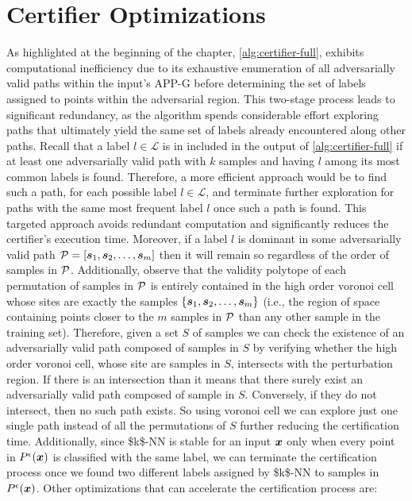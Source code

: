 \section{Certifier Optimizations}
\label{subsec:certifier-optimizations}
As highlighted at the beginning of the chapter, \autoref{alg:certifier-full}, exhibits computational inefficiency due to its exhaustive enumeration of all adversarially valid paths within the input's \acs{APP-G} before determining the set of labels assigned to points within the adversarial region. This two-stage process leads to significant redundancy, as the algorithm spends considerable effort exploring paths that ultimately yield the same set of labels already encountered along other paths. Recall that a label $l \in \mathcal{L}$ is in included in the output of \autoref{alg:certifier-full} if at least one adversarially valid path with $k$ samples and having $l$ among its most common labels is found. Therefore, a more efficient approach would be to find such a path, for each possible label $l \in \mathcal{L}$, and terminate further exploration for paths with the same most frequent label $l$ once such a path is found. This targeted approach avoids redundant computation and significantly reduces the certifier's execution time. Moreover, if a label $l$ is dominant in some adversarially valid path $\vpath = [\sample[1], \sample[2],\ldots,\sample[m]]$ then it will remain so regardless of the order of samples in $\vpath$. Additionally, observe that the validity polytope of each permutation of samples in $\vpath$ is entirely contained in the high order voronoi cell \cite{voronoi-tessellation, high-order-voronoi} whose sites are exactly the samples $\{\sample[1], \sample[2],\ldots,\sample[m]\}$ (i.e., the region of space containing points closer to the $m$ samples in $\vpath$ than any other sample in the training set). Therefore, given a set $S$ of samples we can check the existence of an adversarially valid path composed of samples in $S$ by verifying whether the high order voronoi cell, whose site are samples in $S$, intersects with the perturbation region. If there is an intersection than it means that there surely exist an adversarially valid path composed of sample in $S$. Conversely, if they do not intersect, then no such path exists. So using voronoi cell we can explore just one single path instead of all the permutations of $S$ further reducing the certification time. Additionally, since \acs{$k$-NN} is stable for an input $\vinput$ only when every point in $\pert$ is classified with the same label, we can terminate the certification process once we found two different labels assigned by \acs{$k$-NN} to samples in $\pert$. Other optimizations that can accelerate the certification process are:

